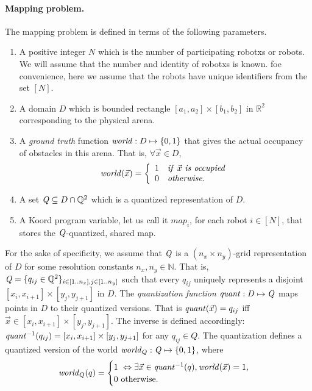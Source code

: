 \paragraph{Mapping problem.}
The mapping problem is defined in terms of the following parameters.
\begin{enumerate}
	\item A positive integer $N$ which is the number of participating robotxs or robots. We will assume that the number and identity of robotxs is known. foe convenience, here we assume that the robots have unique identifiers from the set $[N]$.
	\item A domain $D$ which is bounded rectangle $[a_1,a_2]\times [b_1,b_2]$ in $\mathbb{R}^2$ corresponding to the physical arena.
	\item A \emph{ground truth} function $\mathit{world} : D\mapsto \left\{0,1\right\}$ that gives the actual  occupancy of obstacles in this arena. That is, $\forall \Vec{x} \in D$, 
\begin{align}
\mathit{world}(\Vec{x}) = 
		\left\{
		\begin{array}{ll}
			1 & \mathit{if}\ \Vec{x} \ \mathit{is \ occupied}\\
			0 & \mathit{otherwise}.
		\end{array}
		\right.
\end{align}
	\item A set $\mathit{Q} \subseteq D \cap \mathbb{Q}^2$ which is a quantized representation of $D$.
	\item A Koord program variable, let us call it $\mathit{map}_i$, for each robot $i \in [N]$, that stores the $\mathit{Q}$-quantized, shared map.
\end{enumerate}
For the sake of specificity, we assume that $\mathit{Q}$ is a $(n_x\times n_y)$-grid representation of $D$ for some resolution constants $n_x,n_y \in \mathbb{N}$. That is, $\mathit{Q} = \{q_{ij} \in \mathbb{Q}^2\}_{i\in [1..n_x], j\in [1..n_y]}$ such that every $q_{ij}$ uniquely represents a disjoint $[x_i, x_{i+1}] \times [y_j, y_{j+1}]$ in $D$.
%
    The \emph{quantization function}  $\mathit{quant}:D \mapsto \mathit{Q}$ maps points in $D$ to their quantized versions. That is $\mathit{quant}(\Vec{x}) = q_{ij}$ iff $\Vec{x} \in [x_i, x_{i+1}] \times [y_j, y_{j+1}]$.
The inverse is defined accordingly: $\mathit{quant}^{-1}(q_{ij}) =  [x_i, x_{i+1}] \times [y_j, y_{j+1}]$ for any $q_{ij} \in Q$. 
%
The quantization defines a quantized version of the world $\mathit{world}_Q : \mathit{Q} \mapsto \left\{0,1\right\}$, where
$$\mathit{world}_Q(q) = \begin{cases}
        1\ \Leftrightarrow \exists \Vec{x}\in \mathit{quant}^{-1}(q), \mathit{world}(\Vec{x}) = 1, \\
        0\ \mbox{otherwise}.
\end{cases}
$$
%

